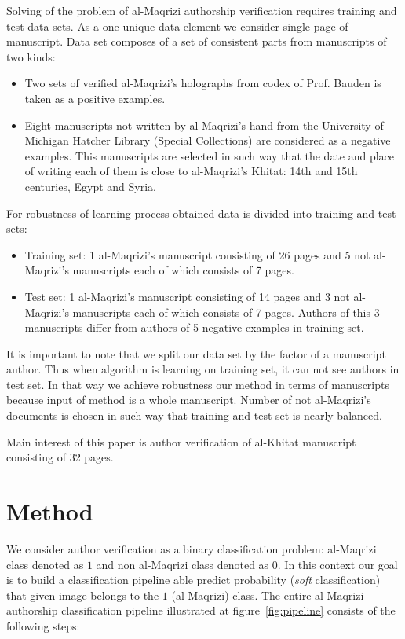 \documentclass[conference,a4paper,twocolumn]{IEEEtran}
\begin{document}
Solving of the problem of al-Maqrizi authorship verification requires training and test data sets. As a one unique data element we consider single page of manuscript. Data set composes of a set of consistent parts from manuscripts of two kinds:
\begin{itemize}
	\item Two sets of verified al-Maqrizi's holographs from codex of Prof. Bauden is taken as a positive examples.
	\item Eight manuscripts not written by al-Maqrizi's hand from the University of Michigan Hatcher Library (Special Collections) are considered as a negative examples. This manuscripts are selected in such way that the date and place of writing each of them is close to al-Maqrizi's Khitat: 14th and 15th centuries, Egypt and Syria.
\end{itemize}
For robustness of learning process obtained data is divided into training and test sets:
\begin{itemize}
	\item Training set: 1 al-Maqrizi's manuscript consisting of 26 pages and 5 not al-Maqrizi's manuscripts each of which consists of 7 pages.
	\item Test set: 1 al-Maqrizi's manuscript consisting of 14 pages and 3 not al-Maqrizi's manuscripts each of which consists of 7 pages. Authors of this 3 manuscripts differ from authors of 5 negative examples in training set.   
\end{itemize}

It is important to note that we split our data set by the factor of a manuscript author. Thus when algorithm is learning on training set, it can not see authors in test set. In that way we achieve robustness our method in terms of manuscripts because input of method is a whole manuscript. Number of not al-Maqrizi's documents is chosen in such way that training and test set is nearly balanced.

Main interest of this paper is author verification of al-Khitat manuscript consisting of 32 pages.



\section{Method}
\label{sec:the_method}

We consider author verification as a binary classification problem: al-Maqrizi class denoted as $1$ and non al-Maqrizi class denoted as $0$. In this context our goal is to build a classification pipeline able predict probability (\textit{soft} classification) that given image belongs to the $1$ (al-Maqrizi) class. The entire al-Maqrizi authorship classification pipeline illustrated at figure~\ref{fig:pipeline} consists of the following steps:
\end{document}
